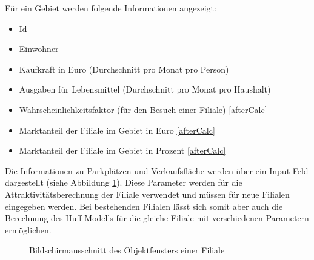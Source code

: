 Für ein Gebiet werden folgende Informationen angezeigt:

\begin{itemize}
	\item Id
	\item Einwohner
	\item Kaufkraft in Euro (Durchschnitt pro Monat pro Person)
	\item Ausgaben für Lebensmittel (Durchschnitt pro Monat pro Haushalt) 
	\item Wahrscheinlichkeitsfaktor (für den Besuch einer Filiale) \cref{afterCalc}
	\item Marktanteil der Filiale im Gebiet in Euro \cref{afterCalc}
	\item Marktanteil der Filiale im Gebiet in Prozent \cref{afterCalc}
\end{itemize}

Die Informationen zu Parkplätzen und Verkaufsfläche werden über ein Input-Feld dargestellt (siehe Abbildung \ref{img:filiale}).
Diese Parameter werden für die Attraktivitätsberechnung der Filiale verwendet und müssen für neue Filialen eingegeben werden.
Bei bestehenden Filialen lässt sich somit aber auch die Berechnung des Huff-Modells für die gleiche Filiale mit verschiedenen Parametern ermöglichen.

\begin{figure}[H]
	\caption{Bildschirmausschnitt des Objektfensters einer Filiale}
	\label{img:filiale}
\end{figure}

